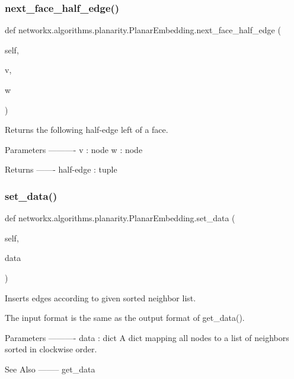 \subsubsection{\texorpdfstring{next\+\_\+face\+\_\+half\+\_\+edge()}{next\_face\_half\_edge()}}
{\footnotesize\ttfamily def networkx.\+algorithms.\+planarity.\+Planar\+Embedding.\+next\+\_\+face\+\_\+half\+\_\+edge (\begin{DoxyParamCaption}\item[{}]{self,  }\item[{}]{v,  }\item[{}]{w }\end{DoxyParamCaption})}

\begin{DoxyVerb}Returns the following half-edge left of a face.

Parameters
----------
v : node
w : node

Returns
-------
half-edge : tuple
\end{DoxyVerb}
 \mbox{\label{classnetworkx_1_1algorithms_1_1planarity_1_1PlanarEmbedding_af42aa6cf4751eb81f7439c1f04b36e74}} 
\subsubsection{\texorpdfstring{set\+\_\+data()}{set\_data()}}
{\footnotesize\ttfamily def networkx.\+algorithms.\+planarity.\+Planar\+Embedding.\+set\+\_\+data (\begin{DoxyParamCaption}\item[{}]{self,  }\item[{}]{data }\end{DoxyParamCaption})}

\begin{DoxyVerb}Inserts edges according to given sorted neighbor list.

The input format is the same as the output format of get_data().

Parameters
----------
data : dict
    A dict mapping all nodes to a list of neighbors sorted in
    clockwise order.

See Also
--------
get_data\end{DoxyVerb}
 \mbox{\label{classnetworkx_1_1algorithms_1_1planarity_1_1PlanarEmbedding_a86753a214cd378f66e4c6c3badba79c0}} 
